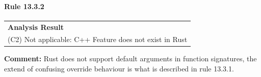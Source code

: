 \paragraph{Rule 13.3.2}
\begin{longtable}{p{13cm}}
\textbf{Analysis Result} \\
(C2) Not applicable: C++ Feature does not exist in Rust \\
\end{longtable}
\textbf{Comment:} Rust does not support default arguments in function signatures, the extend of confusing override behaviour is what is described in rule 13.3.1. \\
